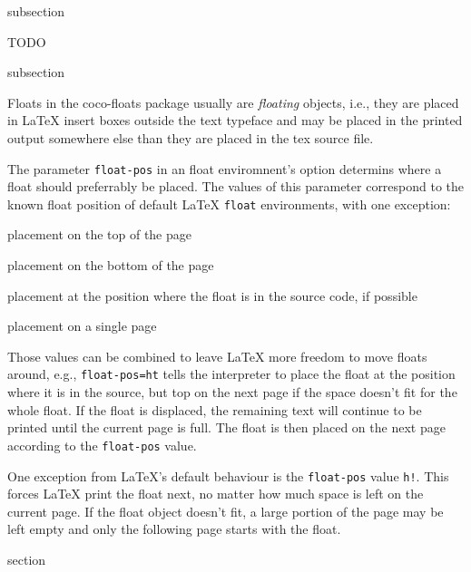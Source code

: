 \begin{heading}[label=sec:flt:classes]{subsection}
\end{heading}

TODO

\begin{heading}[label=sec:flt:floatpos]{subsection}
\end{heading}

Floats in the coco-floats package usually are \textit{floating}
objects, i.e., they are placed in {\LaTeX} insert boxes outside the
text typeface and may be placed in the printed output somewhere else
than they are placed in the tex source file.

The parameter \lstinline{float-pos} in an float enviromnent's option
determins where a float should preferrably be placed. The values of
this parameter correspond to the known float position of default LaTeX
\lstinline{float} environments, with one exception:
\begin{description}[5mm]
\item[t] placement on the top of the page
\item[b] placement on the bottom of the page
\item[h] placement at the position where the float is in the source code, if possible
\item[p] placement on a single page
\end{description}
Those values can be combined to leave {\LaTeX} more freedom to move
floats around, e.g., \lstinline{float-pos=ht} tells the interpreter to
place the float at the position where it is in the source, but top on
the next page if the space doesn't fit for the whole float. If the
float is displaced, the remaining text will continue to be printed
until the current page is full. The float is then placed on the next
page according to the \lstinline{float-pos} value.

One exception from \LaTeX's default behaviour is the
\lstinline{float-pos} value \lstinline{h!}. This forces LaTeX print
the float next, no matter how much space is left on the current
page. If the float object doesn't fit, a large portion of the page may
be left empty and only the following page starts with the float.



\begin{heading}{section}
\end{heading}

